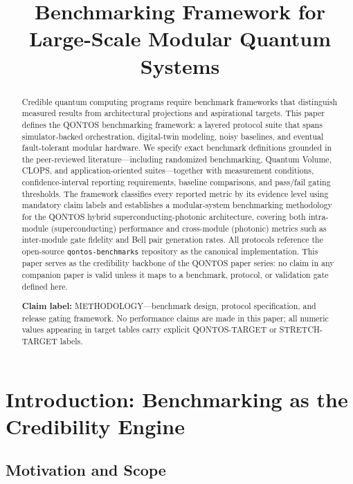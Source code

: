 \documentclass[conference]{IEEEtran}
\begin{document}
\title{Benchmarking Framework for Large-Scale Modular Quantum Systems}
\author{\qontosauthor}
\maketitle

\begin{abstract}
Credible quantum computing programs require benchmark frameworks that distinguish measured results from architectural projections and aspirational targets. This paper defines the QONTOS benchmarking framework: a layered protocol suite that spans simulator-backed orchestration, digital-twin modeling, noisy baselines, and eventual fault-tolerant modular hardware. We specify exact benchmark definitions grounded in the peer-reviewed literature---including randomized benchmarking, Quantum Volume, CLOPS, and application-oriented suites---together with measurement conditions, confidence-interval reporting requirements, baseline comparisons, and pass/fail gating thresholds. The framework classifies every reported metric by its evidence level using mandatory claim labels and establishes a modular-system benchmarking methodology for the QONTOS hybrid superconducting-photonic architecture, covering both intra-module (superconducting) performance and cross-module (photonic) metrics such as inter-module gate fidelity and Bell pair generation rates. All protocols reference the open-source \texttt{qontos-benchmarks} repository as the canonical implementation. This paper serves as the credibility backbone of the QONTOS paper series: no claim in any companion paper is valid unless it maps to a benchmark, protocol, or validation gate defined here.

\textbf{Claim label:} METHODOLOGY---benchmark design, protocol specification, and release gating framework. No performance claims are made in this paper; all numeric values appearing in target tables carry explicit QONTOS-TARGET or STRETCH-TARGET labels.
\end{abstract}

\section{Introduction: Benchmarking as the Credibility Engine}

\subsection{Motivation and Scope}
\end{document}
